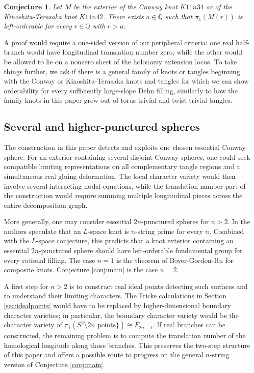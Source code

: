 \documentclass{article}
\theoremstyle{plain}
\theoremstyle{definition}
\theoremstyle{plain}
\theoremstyle{plain}
\theoremstyle{plain}
\theoremstyle{remark}
\theoremstyle{remark}
\theoremstyle{plain}
\newtheorem{conjecture}[theorem]{Conjecture}
\theoremstyle{plain}
\newcounter{main}
\theoremstyle{plain}
\theoremstyle{plain}
\begin{document}
\begin{conjecture}\label{conj:conway}
Let $M$ be the exterior of the Conway knot $K11n34$ or of the Kinoshita-Terasaka knot $K11n42$. There exists $a \in \mathbb{Q}$ such that $\pi_1(M(r))$ is left-orderable for every $r \in \mathbb{Q}$ with $r > a$.
\end{conjecture}

A proof would require a one-sided version of our peripheral criteria: one real half-branch would have longitudinal translation number zero, while the other would be allowed to lie on a nonzero sheet of the holonomy extension locus. To take things further, we ask if there is a general family of knots or tangles beginning with the Conway or Kinoshita-Terasaka knots and tangles for which we can show orderability for every sufficiently large-slope Dehn filling, similarly to how the family knots in this paper grew out of torus-trivial and twist-trivial tangles.

\subsection{Several and higher-punctured spheres}

The construction in this paper detects and exploits one chosen essential Conway sphere. For an exterior containing several disjoint Conway spheres, one could seek compatible limiting representations on all complementary tangle regions and a simultaneous real gluing deformation. The local character variety would then involve several interacting nodal equations, while the translation-number part of the construction would require summing multiple longitudinal pieces across the entire decomposition graph.

\medskip

More generally, one may consider essential $2n$-punctured spheres for $n > 2$. In \cite{lmz} the authors speculate that an $L$-space knot is $n$-string prime for every $n$. Combined with the $L$-space conjecture, this predicts that a knot exterior containing an essential $2n$-punctured sphere should have left-orderable fundamental group for every rational filling. The case $n = 1$ is the theorem of Boyer-Gordon-Hu \cite{boyerhu} for composite knots. Conjecture \ref{conj:main} is the case $n = 2$. 

\medskip

A first step for $n > 2$ is to construct real ideal points detecting such surfaces and to understand their limiting characters. The Fricke calculations in Section \ref{sec:idealpoints} would have to be replaced by higher-dimensional boundary character varieties; in particular, the boundary character variety would be the character variety of $\pi_1(S^2 \setminus 2n \text{ points}\}) \cong F_{2n-1}$. If real branches can be constructed, the remaining problem is to compute the translation number of the homological longitude along those branches. This preserves the two-step structure of this paper and offers a possible route to progress on the general $n$-string version of Conjecture \ref{conj:main}. 
\end{document}
